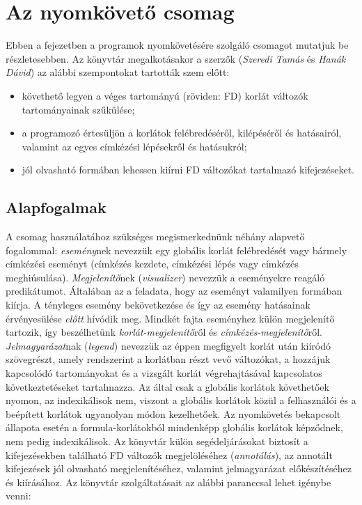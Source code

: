 \clearpage

\chapter{Az \fdbg nyomkövető csomag}

\label{fdbg}
Ebben a fejezetben a \clpfd programok nyomkövetésére szolgáló \fdbg csomagot
mutatjuk be részletesebben. Az \fdbg könyvtár megalkotásakor a szerzők
(\emph{Szeredi Tamás} és \emph{Hanák Dávid}) az alábbi szempontokat tartották
szem előtt:

\begin{itemize}
\item követhető legyen a véges tartományú (röviden: FD) korlát változók
  tartományainak szűkülése;
\item a programozó értesüljön a korlátok felébredéséről, kilépéséről és
  hatásairól, valamint az egyes címkézési lépésekről és hatásukról;
\item jól olvasható formában lehessen kiírni FD változókat tartalmazó
  kifejezéseket.
\end{itemize}

\section{Alapfogalmak}

A csomag használatához szükséges megismerkednünk néhány alapvető fogalommal:
\br
{} {\em esemény}nek nevezzük egy globális korlát felébredését
vagy bármely címkézési eseményt (címkézés kezdete, címkézési lépés vagy címkézés
meghiúsulása).
\br
{} \emph{Megjelenítő}nek (\emph{visualizer}) nevezzük a \clpfd eseményekre
reagáló predikátumot. Általában az a feladata, hogy az eseményt valamilyen formában
kiírja. A tényleges esemény bekövetkezése és így az esemény hatásainak érvényesülése
\emph{előtt} hívódik meg. Mindkét fajta \clpfd eseményhez külön megjelenítő tartozik,
így beszélhetünk \emph{korlát-megjelenítő}ről és \emph{címkézés-megjelenítő}ről.
\br
{} \emph{Jelmagyarázat}nak (\emph{legend}) nevezzük az éppen megfigyelt korlát
után kiíródó szövegrészt, amely rendszerint a korlátban részt vevő változókat, a
hozzájuk kapcsolódó tartományokat és a vizsgált korlát végrehajtásával kapcsolatos
következtetéseket tartalmazza.
\br
Az \fdbg által csak a globális korlátok követhetőek nyomon, az indexikálisok nem,
viszont a globális korlátok közül a felhasználói és a beépített korlátok ugyanolyan
módon kezelhetőek. Az \fdbg nyomkövetés bekapcsolt állapota esetén a formula-korlátokból
mindenképp globális korlátok képződnek, nem pedig indexikálisok.
\br
Az \fdbg könyvtár külön segédeljárásokat biztosít a kifejezésekben található FD
változók megjelöléséhez (\emph{annotálás}), az annotált kifejezések jól olvasható
megjelenítéséhez, valamint jelmagyarázat előkészítéséhez és kiírásához.
\br
Az \fdbg könyvtár szolgáltatásait az alábbi paranccsal lehet igénybe venni:

